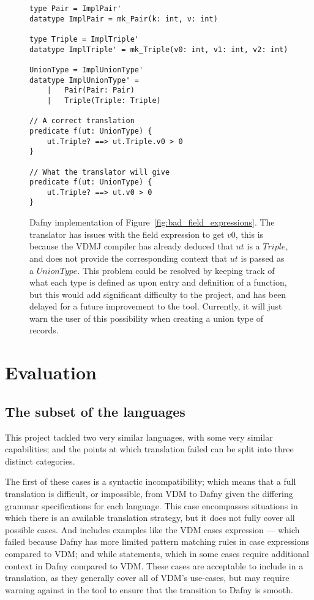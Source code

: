 \documentclass{entcs}
\begin{document}
\begin{figure}[h]
	\begin{center}
        \begin{lstlisting}
type Pair = ImplPair' 
datatype ImplPair = mk_Pair(k: int, v: int)

type Triple = ImplTriple'
datatype ImplTriple' = mk_Triple(v0: int, v1: int, v2: int)

UnionType = ImplUnionType'
datatype ImplUnionType' =
    |   Pair(Pair: Pair)
    |   Triple(Triple: Triple)

// A correct translation
predicate f(ut: UnionType) {
    ut.Triple? ==> ut.Triple.v0 > 0
}

// What the translator will give
predicate f(ut: UnionType) {
    ut.Triple? ==> ut.v0 > 0
}
        \end{lstlisting}
		\caption{Dafny implementation of Figure~\ref{fig:bad_field_expressions}. The translator has issues with the field expression to get $v0$, this is because the VDMJ compiler has already deduced that $ut$ is a $Triple$, and does not provide the corresponding context that $ut$ is passed as a $UnionType$. This problem could be resolved by keeping track of what each type is defined as upon entry and definition of a function, but this would add significant difficulty to the project, and has been delayed for a future improvement to the tool. Currently, it will just warn the user of this possibility when creating a union type of records.}\label{fig:bad_field_expressions_dafny}
	\end{center}
\end{figure}


\section{Evaluation}\label{section:evaluation}

\subsection{The subset of the languages}

This project tackled two very similar languages, with some very similar capabilities; and the points at which translation failed can be split into three distinct categories. 

The first of these cases is a syntactic incompatibility; which means that a full translation is difficult, or impossible, from VDM to Dafny given the differing grammar specifications for each language. This case encompasses situations in which there is an available translation strategy, but it does not fully cover all possible cases. And includes examples like the VDM cases expression --- which failed because Dafny has more limited pattern matching rules in case expressions compared to VDM; and while statements, which in some cases require additional context in Dafny compared to VDM. These cases are acceptable to include in a translation, as they generally cover all of VDM's use-cases, but may require warning against in the tool to ensure that the transition to Dafny is smooth.
\end{document}
